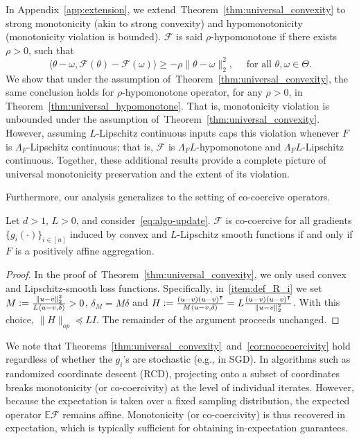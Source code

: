 \documentclass[twoside,11pt]{article}
\newcommand{\E}{\mathbb{E}}
\newcommand{\F}{\mathcal{F}}
\begin{document}
\begin{remark}\label{rem:violation-caped}
    In Appendix~\ref{app:extension}, we extend~Theorem~\ref{thm:universal_convexity} to strong monotonicity (akin to strong convexity) and hypomonotonicity (monotonicity violation is bounded).
    $\F$ is said $\rho$-hypomonotone if there exists $\rho > 0$, such that
    \begin{equation*}\label{eq:hypomonotonicity-main}
        \langle \theta - \omega, \F(\theta) - \F(\omega) \rangle \geq -\rho \| \theta - \omega \|^2_2, \quad\text{ for all } \theta, \omega \in \Theta.
    \end{equation*}
    We show that under the assumption of~Theorem~\ref{thm:universal_convexity}, the same conclusion holds for $\rho$-hypomonotone operator, for any $\rho>0$, in Theorem~\ref{thm:universal_hypomonotone}.
    That is, monotonicity violation is unbounded under the assumption of~Theorem~\ref{thm:universal_convexity}. 
    However, assuming $L$-Lipschitz continuous inputs caps this violation whenever $F$ is $\Lambda_F$-Lipschitz continuous; that is, $\F$ is $\Lambda_F L$-hypomonotone and $\Lambda_F L$-Lipschitz continuous. 
    Together, these additional results provide a complete picture of universal monotonicity preservation and the extent of its violation.
\end{remark}
Furthermore, our analysis generalizes to the setting of co-coercive operators.
\begin{theorem}\label{cor:nococoercivity}
    Let $d>1$, $L > 0$, and consider~\eqref{eq:algo-update}. 
    $\F$ is co-coercive for all gradients $\{g_i(\cdot)\}_{i\in[n]}$ induced by convex and $L$-Lipschitz smooth functions if and only if $F$ is a positively affine aggregation.
\end{theorem}
\begin{proof}
    In the proof of~Theorem~\ref{thm:universal_convexity}, we only used convex and Lipschitz-smooth loss functions.
    Specifically, in~\ref{item:def_R_i} we set $M \vcentcolon=  \frac{\|u-v\|^2_2}{L \langle u-v, \delta \rangle} > 0$, $\delta_M = M \delta$ and $H \vcentcolon= \frac{(u-v) (u-v)^\intercal}{M \langle u-v, \delta \rangle} = L \frac{(u-v) (u-v)^\intercal}{\|u-v\|^2_2}$. 
    With this choice, $\| H \|_{op} \preceq L I$. 
    The remainder of the argument proceeds unchanged.
\end{proof}
We note that Theorems~\ref{thm:universal_convexity}~and~\ref{cor:nococoercivity} hold regardless of whether the $g_i$'s are stochastic (e.g., in SGD). 
In algorithms such as randomized coordinate descent (RCD), projecting onto a subset of coordinates breaks monotonicity (or co-coercivity) at the level of individual iterates. 
However, because the expectation is taken over a fixed sampling distribution, the expected operator $\E\F$ remains affine. 
Monotonicity (or co-coercivity) is thus recovered in expectation, which is typically sufficient for obtaining in-expectation guarantees.
\end{document}
